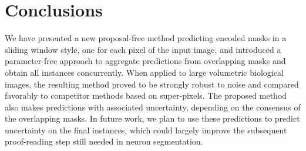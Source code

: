 
\section{Conclusions}
We have presented a new proposal-free method predicting encoded \maskname masks in a sliding window style, one for each pixel of the input image, and introduced a parameter-free approach to aggregate predictions from overlapping masks and obtain all instances concurrently.
When applied to large volumetric biological images, the resulting method proved to be strongly robust to noise and compared favorably to competitor methods based on super-pixels.
The proposed method also makes predictions with associated uncertainty, depending on the consensus of the overlapping \maskname masks. In future work, we plan to use these predictions to predict uncertainty on the final instances, which could largely improve the subsequent proof-reading step still needed in neuron segmentation.
